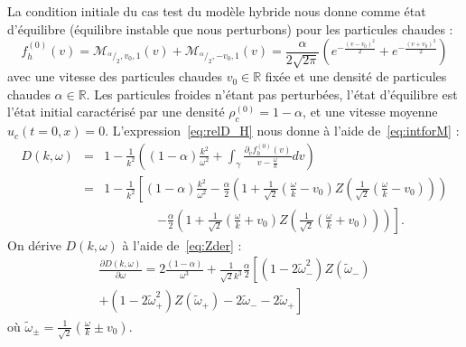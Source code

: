 La condition initiale du cas test du modèle hybride nous donne comme état d'équilibre (équilibre instable que nous perturbons) pour les particules chaudes :
$$
  f_h^{(0)}(v) = \mathcal{M}_{^\alpha/_2,v_0,1}(v) + \mathcal{M}_{^\alpha/_2,-v_0,1}(v) = \frac{\alpha}{2\sqrt{2\pi}}\left( e^{-\frac{(v-v_0)^2}{2}} + e^{-\frac{(v+v_0)^2}{2}} \right)
$$
avec une vitesse des particules chaudes $v_0\in\mathbb{R}$ fixée et une densité de particules chaudes $\alpha\in\mathbb{R}$. Les particules froides n'étant pas perturbées, l'état d'équilibre est l'état initial caractérisé par une densité $\rho_c^{(0)}= 1-\alpha$, et une vitesse moyenne $u_c(t=0,x)=0$. L'expression~\eqref{eq:relD_H} nous donne à l'aide de~\eqref{eq:intforM} :
\begin{eqnarray}
  D(k,\omega)
    &=&1-\frac{1}{k^2}\left(\left(1-\alpha\right)\frac{k^2}{\omega^2}+\int_\gamma \frac{\partial_vf_h^{(0)}(v)}{v-\frac{\omega}{k}}dv\right)\nonumber\\
    &=&1-\frac{1}{k^2}\left[\left(1-\alpha\right)\frac{k^2}{\omega^2}-\frac{\alpha}{2}\left(1+\frac{1}{\sqrt{2}}\left(\frac{\omega}{k}-v_0\right)Z\left(\frac{1}{\sqrt{2}}\left(\frac{\omega}{k}-v_0\right)\right)\right)\right.\nonumber\\
    &&~~~~~~~~~~~~~~~~~~~\left.-\frac{\alpha}{2}\left(1+\frac{1}{\sqrt{2}}\left(\frac{\omega}{k}+v_0\right)Z\left(\frac{1}{\sqrt{2}}\left(\frac{\omega}{k}+v_0\right)\right)\right)\right].
  \label{eq:D_hchyb}
\end{eqnarray}
On dérive $D(k,\omega)$ à l'aide de~\eqref{eq:Zder} :
\begin{equation}
  \begin{aligned}
    \frac{\partial D(k,\omega)}{\partial \omega} = 2\frac{\left(1-\alpha\right)}{\omega^3}+\frac{1}{\sqrt{2}k^3}\frac{\alpha}{2}\left[\left(1-2\tilde{\omega}_-^2\right)Z\left(\tilde{\omega}_-\right)\right. \\
      \left.+\left(1-2\tilde{\omega}_+^2\right)Z\left(\tilde{\omega}_+\right)-2\tilde{\omega}_--2\tilde{\omega}_+\right]
  \end{aligned}
  \label{eq:hchybderD}
\end{equation}
où $\tilde{\omega}_\pm=\frac{1}{\sqrt{2}}\left(\frac{\omega}{k}\pm v_0\right)$.

